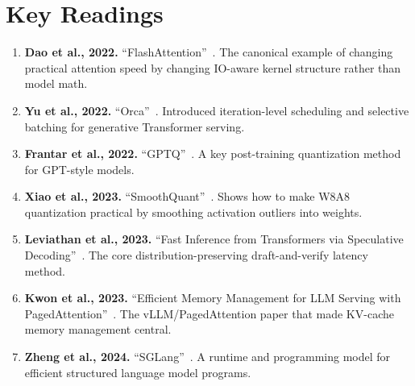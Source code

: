 \section*{Key Readings}

\begin{enumerate}[nosep]
  \item \textbf{Dao et al., 2022.} ``FlashAttention''~\cite{dao2022flashattention}. The canonical example of changing practical attention speed by changing IO-aware kernel structure rather than model math.
  \item \textbf{Yu et al., 2022.} ``Orca''~\cite{yu2022orca}. Introduced iteration-level scheduling and selective batching for generative Transformer serving.
  \item \textbf{Frantar et al., 2022.} ``GPTQ''~\cite{frantar2022gptq}. A key post-training quantization method for GPT-style models.
  \item \textbf{Xiao et al., 2023.} ``SmoothQuant''~\cite{xiao2023smoothquant}. Shows how to make W8A8 quantization practical by smoothing activation outliers into weights.
  \item \textbf{Leviathan et al., 2023.} ``Fast Inference from Transformers via Speculative Decoding''~\cite{leviathan2023speculative}. The core distribution-preserving draft-and-verify latency method.
  \item \textbf{Kwon et al., 2023.} ``Efficient Memory Management for LLM Serving with PagedAttention''~\cite{kwon2023pagedattention}. The vLLM/PagedAttention paper that made KV-cache memory management central.
  \item \textbf{Zheng et al., 2024.} ``SGLang''~\cite{zheng2024sglang}. A runtime and programming model for efficient structured language model programs.
\end{enumerate}

\flushbottom
